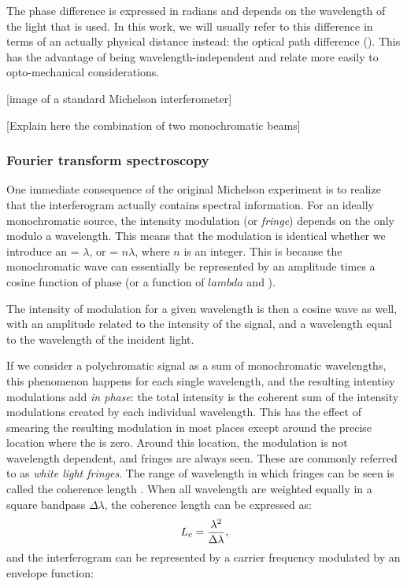 The phase difference is expressed in radians and depends on the wavelength of the light that is used. In this work, we will usually refer to this difference in terms of an actually physical distance instead: the optical path difference (\OPD). This has the advantage of being wavelength-independent and relate more easily to opto-mechanical considerations.

[image of a standard Michelson interferometer]

[Explain here the combination of two monochromatic beams]


\subsubsection{Fourier transform spectroscopy}

One immediate consequence of the original Michelson experiment is to realize that the interferogram actually contains spectral information. For an ideally monochromatic source, the intensity modulation (or \textit{fringe}) depends on the \OPD only modulo a wavelength. This means that the modulation is identical whether we introduce an \OPD = $\lambda$, or \OPD = $n\lambda$, where $n$ is an integer. This is because the monochromatic wave can essentially be represented by an amplitude times a cosine function of phase (or a function of $lambda$ and \OPD).

The intensity of modulation for a given wavelength is then a cosine wave as well, with an amplitude related to the intensity of the signal, and a wavelength equal to the wavelength of the incident light.

If we consider a polychromatic signal as a sum of monochromatic wavelengths, this phenomenon happens for each single wavelength, and the resulting intentisy modulations add \textit{in phase}: the total intensity is the coherent sum of the intensity modulations created by each individual wavelength. This has the effect of smearing the resulting modulation in most places except around the precise location where the \OPD is zero. Around this location, the modulation is not wavelength dependent, and fringes are always seen. These are commonly referred to as \textit{white light fringes}. The range of wavelength in which fringes can be seen is called the coherence length \Lc. When all wavelength are weighted equally in a square bandpass $\Delta\lambda$, the coherence length can be expressed as:
\begin{equation}
L_c = \frac{\lambda^2}{\Delta\lambda},
\end{equation}
and the interferogram can be represented by a carrier frequency modulated by an envelope function:

